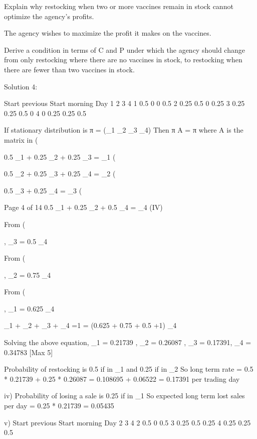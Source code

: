 \item  Explain why restocking when two or more vaccines remain in stock cannot optimize the agency’s profits.

The agency wishes to maximize the profit it makes on the vaccines.
\item   Derive a condition in terms of C and P under which the agency should change from only restocking where there are no vaccines in stock, to restocking when there are fewer than two vaccines in stock.


Solution 4:
\item 
Start previous Start morning
Day 1 2 3 4
1 0.5 0 0 0.5
2 0.25 0.5 0 0.25
3 0.25 0.25 0.5 0
4 0 0.25 0.25 0.5

\item  
If stationary distribution is π = (\pi_{1} \pi_{2} \pi_{3} \pi_{4})
Then π A = π where A is the matrix in (\item 

0.5 \pi_{1} + 0.25 \pi_{2} + 0.25 \pi_{3} = \pi_{1} (\item  
0.5 \pi_{2} + 0.25 \pi_{3} + 0.25 \pi_{4} = \pi_{2} (\item   
0.5 \pi_{3} + 0.25 \pi_{4} = \pi_{3} (\item  

Page 4 of 14
0.5 \pi_{1} + 0.25 \pi_{2} + 0.5 \pi_{4} = \pi_{4} (IV)

From (\item  , \pi_{3} = 0.5 \pi_{4}

From (\item  , \pi_{2} = 0.75 \pi_{4}

From (\item , \pi_{1} = 0.625 \pi_{4}

\pi_{1} + \pi_{2} + \pi_{3} + \pi_{4} =1 = (0.625 + 0.75 + 0.5 +1) \pi_{4}

Solving the above equation,
\pi_{1} = 0.21739 , \pi_{2} = 0.26087 , \pi_{3} = 0.17391, \pi_{4} = 0.34783 
[Max 5]
\item  
Probability of restocking is 0.5 if in \pi_{1} and 0.25 if in \pi_{2}
So long term rate = 0.5 * 0.21739 + 0.25 * 0.26087 
= 0.108695 + 0.06522 = 0.17391 per trading day 

iv)
Probability of losing a sale is 0.25 if in \pi_{1} 
So expected long term lost sales per day = 0.25 * 0.21739 = 0.05435 

v)
Start previous Start morning
Day 2 3 4
2 0.5 0 0.5
3 0.25 0.5 0.25
4 0.25 0.25 0.5

